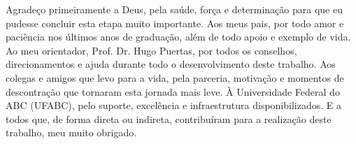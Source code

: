 \begin{agradecimentos}

Agradeço primeiramente a Deus, pela saúde, força e determinação para que eu pudesse concluir esta etapa muito importante. Aos meus pais, por todo amor e paciência nos últimos anos de graduação, além de todo apoio e exemplo de vida. Ao meu orientador, Prof. Dr. Hugo Puertas, por todos os conselhos, direcionamentos e ajuda durante todo o desenvolvimento deste trabalho. Aos colegas e amigos que levo para a vida, pela parceria, motivação e momentos de descontração que tornaram esta jornada mais leve. À Universidade Federal do ABC (UFABC), pelo suporte, excelência e infraestrutura disponibilizados. E a todos que, de forma direta ou indireta, contribuíram para a realização deste trabalho, meu muito obrigado.

\end{agradecimentos}
